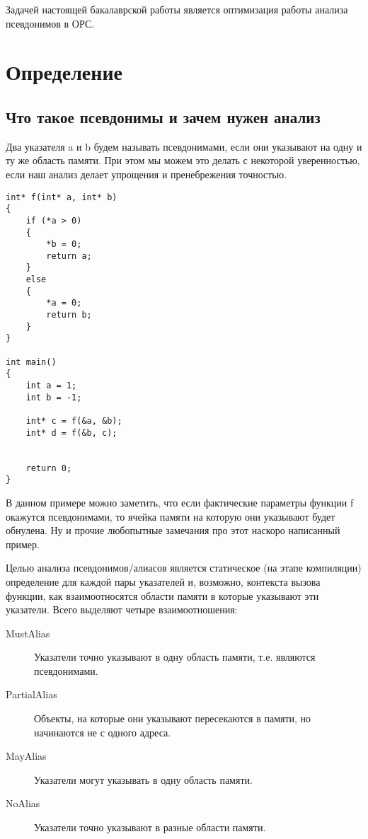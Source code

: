 





\Intro

Задачей настоящей бакалаврской работы является оптимизация работы анализа псевдонимов в ОРС.

\section{Определение}
\label{sec:examples}

\subsection{Что такое псевдонимы и зачем нужен анализ}

Два указателя a и b будем называть псевдонимами, если они указывают на одну и ту же область памяти. При этом мы можем это делать с некоторой уверенностью, если наш анализ делает упрощения и пренебрежения точностью.

\begin{lstlisting}
int* f(int* a, int* b)
{
    if (*a > 0)
    {
        *b = 0;
        return a;
    }
    else
    {
        *a = 0;
        return b;
    }
}

int main()
{
    int a = 1;
    int b = -1;

    int* c = f(&a, &b);
    int* d = f(&b, c);


    return 0;
}
\end{lstlisting}

В данном примере можно заметить, что если фактические параметры функции f окажутся псевдонимами, то ячейка памяти на которую они указывают будет обнулена. Ну и прочие любопытные замечания про этот наскоро написанный пример.

Целью анализа псевдонимов/алиасов является статическое (на этапе компиляции) определение для каждой пары указателей и, возможно, контекста вызова функции, как взаимоотносятся области памяти в которые указывают эти указатели. Всего выделяют четыре взаимоотношения:
\begin{description}
  \item[MustAlias] Указатели точно указывают в одну область памяти, т.е. являются псевдонимами.
  \item[PartialAlias] Объекты, на которые они указывают пересекаются в памяти, но начинаются не с одного адреса.
  \item[MayAlias] Указатели могут указывать в одну область памяти.
  \item[NoAlias] Указатели точно указывают в разные области памяти.
\end{description}


